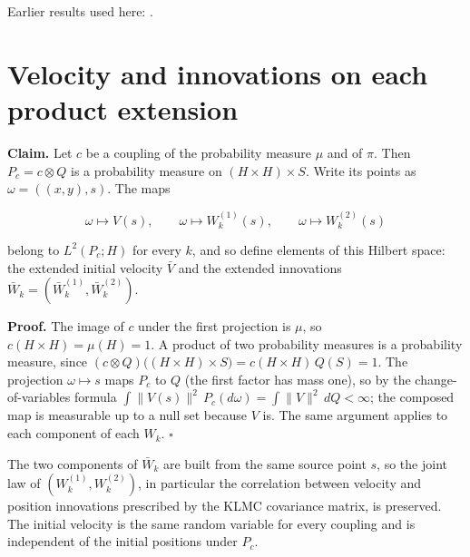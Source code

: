 \documentclass[11pt,a4paper]{article}
\begin{document}
Earlier results used here: \cite[Section~3.23]{LangevinLean2026ULASC}.

\section{\texorpdfstring{Velocity and innovations on each product extension}{Velocity and innovations on each product extension}}


\textbf{Claim.} Let \(c\) be a coupling of the probability measure \(\mu\) and of \(\pi\). Then \(P_c=c\otimes Q\) is a probability measure on \((H\times H)\times S\). Write its points as \(\omega=((x,y),s)\). The maps


\[\omega\mapsto V(s),\qquad\omega\mapsto W_k^{(1)}(s),\qquad\omega\mapsto W_k^{(2)}(s)\]


belong to \(L^2(P_c;H)\) for every \(k\), and so define elements of this Hilbert space: the extended initial velocity \(\bar V\) and the extended innovations \(\bar W_k=(\bar W_k^{(1)},\bar W_k^{(2)})\).




\textbf{Proof.} The image of \(c\) under the first projection is \(\mu\), so \(c(H\times H)=\mu(H)=1\). A product of two probability measures is a probability measure, since \((c\otimes Q)\bigl((H\times H)\times S\bigr)=c(H\times H)\,Q(S)=1\). The projection \(\omega\mapsto s\) maps \(P_c\) to \(Q\) (the first factor has mass one), so by the change-of-variables formula \(\int\|V(s)\|^2\,P_c(d\omega)=\int\|V\|^2\,dQ<\infty\); the composed map is measurable up to a null set because \(V\) is. The same argument applies to each component of each \(W_k\). \(\square\)




The two components of \(\bar W_k\) are built from the same source point \(s\), so the joint law of \((W_k^{(1)},W_k^{(2)})\), in particular the correlation between velocity and position innovations prescribed by the KLMC covariance matrix, is preserved. The initial velocity is the same random variable for every coupling and is independent of the initial positions under \(P_c\).
\end{document}
